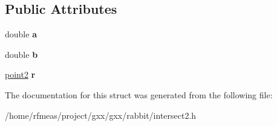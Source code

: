 \subsection*{Public Attributes}
\begin{DoxyCompactItemize}
\item 
double {\bfseries a}\hypertarget{structrabbit_1_1tpoint_a00f6b27daceede746b6655d8bc0c8dc1}{}\label{structrabbit_1_1tpoint_a00f6b27daceede746b6655d8bc0c8dc1}

\item 
double {\bfseries b}\hypertarget{structrabbit_1_1tpoint_aa94638ff2e1232ba274ae1dde99ddfe3}{}\label{structrabbit_1_1tpoint_aa94638ff2e1232ba274ae1dde99ddfe3}

\item 
\hyperlink{classmalgo_1_1vector2}{point2} {\bfseries r}\hypertarget{structrabbit_1_1tpoint_a6fec707252b9e4e384c42cf30a94ac52}{}\label{structrabbit_1_1tpoint_a6fec707252b9e4e384c42cf30a94ac52}

\end{DoxyCompactItemize}


The documentation for this struct was generated from the following file\+:\begin{DoxyCompactItemize}
\item 
/home/rfmeas/project/gxx/gxx/rabbit/intersect2.\+h\end{DoxyCompactItemize}
